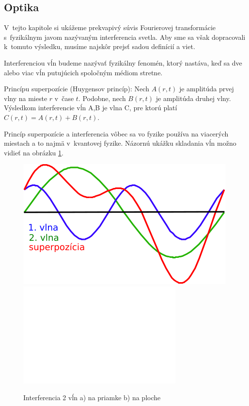 \subsection{Optika}

V~tejto kapitole si ukážeme prekvapivý súvis Fourierovej transformácie
s~fyzikálnym javom nazývaným interferencia svetla. Aby sme sa však
dopracovali k~tomuto výsledku, musíme najskôr prejsť sadou definícií a
viet.

\begin{definicia}
Interferenciou vĺn budeme nazývať fyzikálny fenomén, ktorý
nastáva, keď sa dve alebo viac vĺn putujúcich spoločným médiom
stretne.
\end{definicia}

\begin{veta}
Princípu superpozície (Huygensov princíp):
Nech $A(r,t)$ je amplitúda prvej vlny na mieste $r$ v~čase $t$.
Podobne, nech $B(r,t)$ je amplitúda druhej vlny.
Výsledkom interferencie vĺn A,B je vlna C, pre ktorú platí
 $C(r,t)=A(r,t)+B(r,t)$. 
\end{veta}

Princíp superpozície a interferencia vôbec sa vo
 fyzike používa na viacerých miestach a to najmä v~kvantovej fyzike.
Názornú ukážku skladania vĺn možno vidieť na obrázku
 \ref{fig:interferencia}.


 \begin{figure}[htp]
 \centering
 \includegraphics{obrazky/fyzika/optika/interferencia_1}
 \includegraphics{obrazky/fyzika/optika/interferencia_2}

 \caption{Interferencia 2 vĺn a) na priamke b) na ploche}
 \label{fig:interferencia}
 \end{figure}


